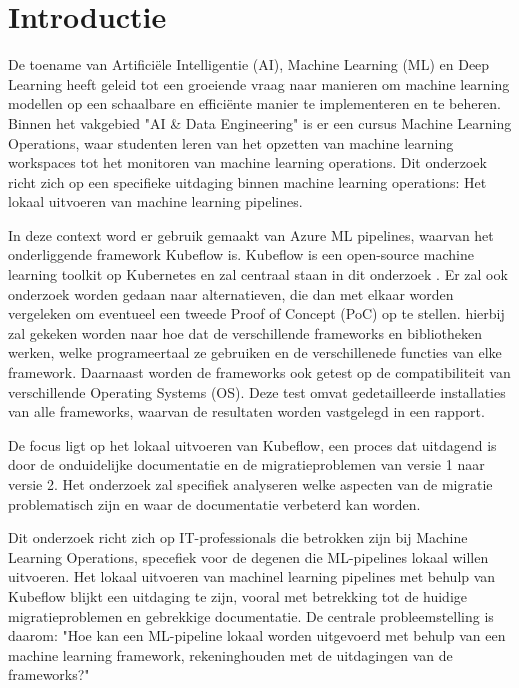 
\section{Introductie}%
\label{sec:introductie}

De toename van Artificiële Intelligentie (AI), Machine Learning (ML) en Deep Learning heeft geleid tot een groeiende vraag naar manieren om machine learning modellen op een schaalbare en efficiënte manier te implementeren en te beheren.
Binnen het vakgebied "AI \& Data Engineering" is er een cursus Machine Learning Operations, waar studenten leren van het opzetten van machine learning workspaces tot het monitoren van machine learning operations.
Dit onderzoek richt zich op een specifieke uitdaging binnen machine learning operations: Het lokaal uitvoeren van machine learning pipelines.\newline

In deze context word er gebruik gemaakt van Azure ML pipelines, waarvan het onderliggende framework Kubeflow is. Kubeflow is een open-source machine learning toolkit op Kubernetes en zal centraal staan in dit onderzoek \autocite{Kubeflow2021}.
Er zal ook onderzoek worden gedaan naar alternatieven, die dan met elkaar worden vergeleken om eventueel een tweede Proof of Concept (PoC) op te stellen. hierbij zal gekeken worden naar hoe dat de verschillende frameworks en bibliotheken werken, welke programeertaal ze gebruiken en de verschillenede functies van elke framework.
Daarnaast worden de frameworks ook getest op de compatibiliteit van verschillende Operating Systems (OS). Deze test omvat gedetailleerde installaties van alle frameworks, waarvan de resultaten worden vastgelegd in een rapport.\newline

De focus ligt op het lokaal uitvoeren van Kubeflow, een proces dat uitdagend is door de onduidelijke documentatie en de migratieproblemen van versie 1 naar versie 2.
Het onderzoek zal specifiek analyseren welke aspecten van de migratie problematisch zijn en waar de documentatie verbeterd kan worden.\newline

Dit onderzoek richt zich op IT-professionals die betrokken zijn bij Machine Learning Operations, specefiek voor de degenen die ML-pipelines lokaal willen uitvoeren.
Het lokaal uitvoeren van machinel learning pipelines met behulp van Kubeflow blijkt een uitdaging te zijn, vooral met betrekking tot de huidige migratieproblemen en gebrekkige documentatie.
De centrale probleemstelling is daarom: "Hoe kan een ML-pipeline lokaal worden uitgevoerd met behulp van een machine learning framework, rekeninghouden met de uitdagingen van de frameworks?"

